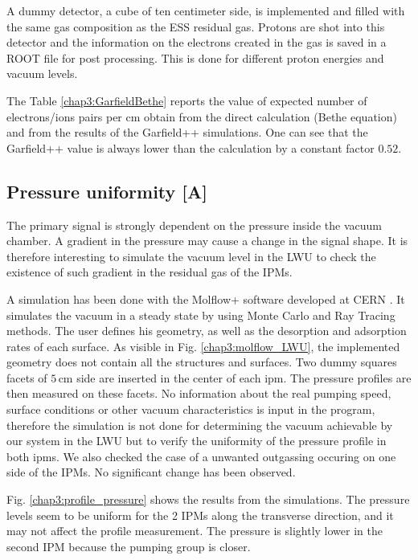 \begin{refsection}
  
  A dummy detector, a cube of ten centimeter side, is implemented and filled with the same gas composition as the ESS residual gas. Protons are shot into this detector and the information on the electrons created in the gas is saved in a ROOT file \cite{Brun1997,Antcheva2009} for post processing. This is done for different proton energies and vacuum levels.

  The Table \ref{chap3:GarfieldBethe} reports the value of expected number of electrons/ions pairs per cm obtain from the direct calculation (Bethe equation) and from the results of the Garfield++ simulations. One can see that the Garfield++ value is always lower than the calculation by a constant factor $0.52$.


  \subsection{Pressure uniformity [A]}

  The primary signal is strongly dependent on the pressure inside the vacuum chamber. A gradient in the pressure may cause a change in the signal shape. It is therefore interesting to simulate the vacuum level in the LWU to check the existence of such gradient in the residual gas of the IPMs.

  

  A simulation has been done with the Molflow+ software developed at CERN \cite{Kersevan2009}. It simulates the vacuum in a steady state by using Monte Carlo and Ray Tracing methods. The user defines his geometry, as well as the desorption and adsorption rates of each surface. As visible in Fig. \ref{chap3:molflow_LWU}, the implemented geometry does not contain all the structures and surfaces. Two dummy squares facets of $5\,\mathrm{cm}$ side are inserted in the center of each \acrshort{ipm}. The pressure profiles are then measured on these facets. No information about the real pumping speed, surface conditions or other vacuum characteristics is input in the program, therefore the simulation is not done for determining the vacuum achievable by our system in the LWU but to verify the uniformity of the pressure profile in both \acrshort{ipm}s. We also checked the case of a unwanted outgassing occuring on one side of the IPMs. No significant change has been observed.

  

  Fig. \ref{chap3:profile_pressure} shows the results from the simulations. The pressure levels seem to be uniform for the 2 IPMs along the transverse direction, and it may not affect the profile measurement. The pressure is slightly lower in the second IPM because the pumping group is closer.


\end{refsection}
